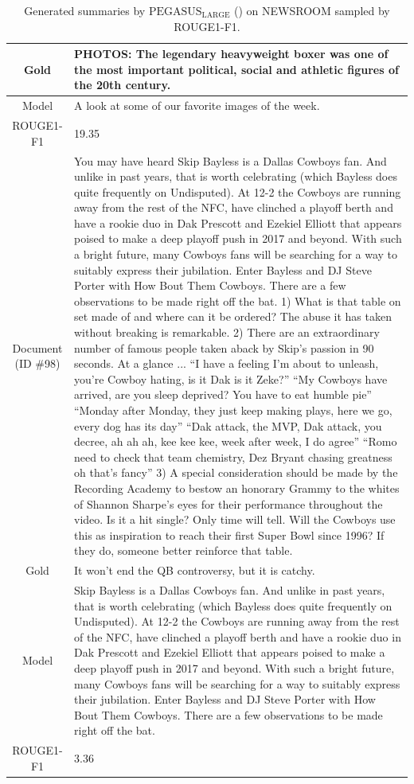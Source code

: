 \begin{table}[bth!]
\begin{tabular}{c|p{}}
\\ \hline
Gold & 
PHOTOS: The legendary heavyweight boxer was one of the most important political, social and athletic figures of the 20th century.
\\ \hline
Model & 
A look at some of our favorite images of the week.
\\ \hline
ROUGE1-F1 & 
19.35
\\ \hline
\makecell{Document\\(ID \#98)} & 
You may have heard Skip Bayless is a Dallas Cowboys fan. And unlike in past years, that is worth celebrating (which Bayless does quite frequently on Undisputed). At 12-2 the Cowboys are running away from the rest of the NFC, have clinched a playoff berth and have a rookie duo in Dak Prescott and Ezekiel Elliott that appears poised to make a deep playoff push in 2017 and beyond. With such a bright future, many Cowboys fans will be searching for a way to suitably express their jubilation. Enter Bayless and DJ Steve Porter with How Bout Them Cowboys. There are a few observations to be made right off the bat. 1) What is that table on set made of and where can it be ordered? The abuse it has taken without breaking is remarkable. 2) There are an extraordinary number of famous people taken aback by Skip’s passion in 90 seconds. At a glance ... “I have a feeling I’m about to unleash, you’re Cowboy hating, is it Dak is it Zeke?” “My Cowboys have arrived, are you sleep deprived? You have to eat humble pie” “Monday after Monday, they just keep making plays, here we go, every dog has its day” “Dak attack, the MVP, Dak attack, you decree, ah ah ah, kee kee kee, week after week, I do agree” “Romo need to check that team chemistry, Dez Bryant chasing greatness oh that’s fancy” 3) A special consideration should be made by the Recording Academy to bestow an honorary Grammy to the whites of Shannon Sharpe’s eyes for their performance throughout the video. Is it a hit single? Only time will tell. Will the Cowboys use this as inspiration to reach their first Super Bowl since 1996? If they do, someone better reinforce that table.
\\ \hline
Gold & 
It won't end the QB controversy, but it is catchy.
\\ \hline
Model & 
Skip Bayless is a Dallas Cowboys fan. And unlike in past years, that is worth celebrating (which Bayless does quite frequently on Undisputed). At 12-2 the Cowboys are running away from the rest of the NFC, have clinched a playoff berth and have a rookie duo in Dak Prescott and Ezekiel Elliott that appears poised to make a deep playoff push in 2017 and beyond. With such a bright future, many Cowboys fans will be searching for a way to suitably express their jubilation. Enter Bayless and DJ Steve Porter with How Bout Them Cowboys. There are a few observations to be made right off the bat.
\\ \hline
ROUGE1-F1 & 
3.36
\\ \hline
\end{tabular}
\caption{Generated summaries by $\text{PEGASUS}_{\text{LARGE}}$ (\gnews) on NEWSROOM sampled by ROUGE1-F1.}
\end{table}
